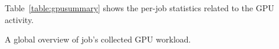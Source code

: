 Table~\ref{table:gpusummary} shows the per-job statistics related to the GPU activity.

\begin{table}[hb]
    \centering
    
    \caption{A global overview of job's collected GPU workload.}\label{table:gpusummary}
\end{table}

